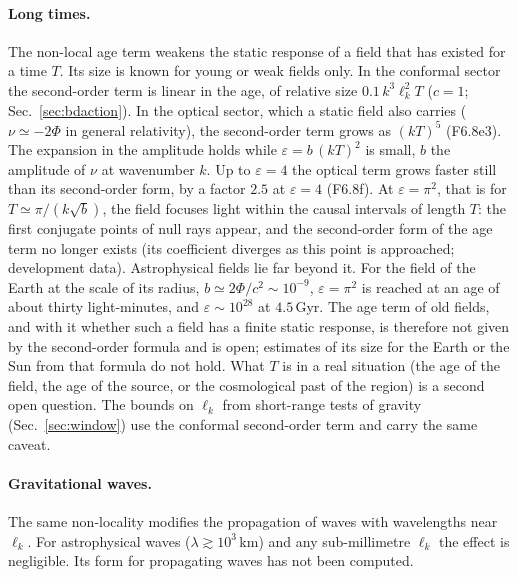 \paragraph{Long times.} The non-local age term weakens the static response of a field that has existed for
a time $T$. Its size is known for young or weak fields only. In the conformal sector the second-order term is linear
in the age, of relative size $0.1\,k^3\ell_k^2T$ ($c=1$; Sec.~\ref{sec:bdaction}). In the optical sector, which a
static field also carries ($\nu\simeq-2\Phi$ in general relativity), the second-order term grows as $(kT)^5$
(F6.8e3). The expansion in the amplitude holds while $\varepsilon=b\,(kT)^2$ is small, $b$ the amplitude of $\nu$ at
wavenumber $k$. Up to $\varepsilon=4$ the optical term grows faster still than its second-order form, by a factor
$2.5$ at $\varepsilon=4$ (F6.8f). At $\varepsilon=\pi^2$, that is for $T\simeq\pi/(k\sqrt b)$, the field focuses
light within the causal intervals of length $T$: the first conjugate points of null rays appear, and the
second-order form of the age term no longer exists (its coefficient diverges as this point is approached;
development data). Astrophysical fields lie far beyond it. For the field of the Earth at the scale of its radius,
$b\simeq2\Phi/c^2\sim10^{-9}$, $\varepsilon=\pi^2$ is reached at an age of about thirty light-minutes, and
$\varepsilon\sim10^{28}$ at $4.5$\,Gyr. The age term of old fields, and with it whether such a field has a finite
static response, is therefore not given by the second-order formula and is open; estimates of its size for the
Earth or the Sun from that formula do not hold. What $T$ is in a real situation (the age of the field, the age of
the source, or the cosmological past of the region) is a second open question. The bounds on $\ell_k$ from
short-range tests of gravity (Sec.~\ref{sec:window}) use the conformal second-order term and carry the same
caveat. 

\paragraph{Gravitational waves.} The same non-locality modifies the propagation of waves with wavelengths
near $\ell_k$. For astrophysical waves ($\lambda\gtrsim10^3$\,km) and any sub-millimetre $\ell_k$ the effect
is negligible. Its form for propagating waves has not been computed. 

